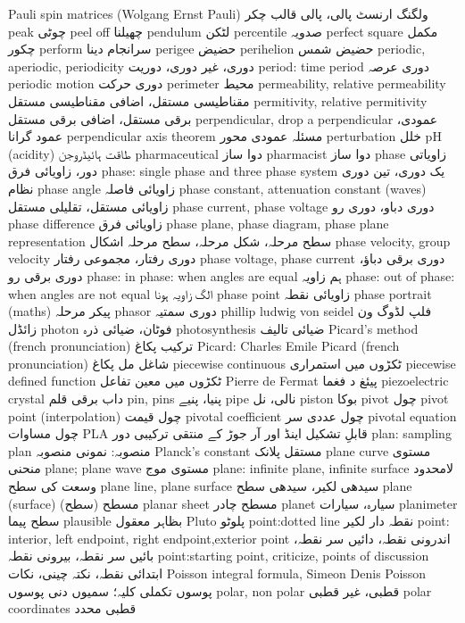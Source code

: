 Pauli spin matrices (Wolgang Ernst Pauli)	ولگنگ ارنسٹ پالی، پالی قالب چکر
peak	چوٹی
peel off	چھیلنا
pendulum	لٹکن
percentile	صدویہ
perfect square	مکمل چکور
perform	سرانجام دینا
perigee	حضیض
perihelion	حضیض شمس
periodic, aperiodic, periodicity	دوری، غیر دوری، دوریت
period: time period	دوری عرصہ
periodic motion	دوری حرکت
perimeter	محیط
permeability, relative permeability	مقناطیسی مستقل، اضافی مقناطیسی مستقل
permitivity, relative permitivity	برقی مستقل، اضافی برقی مستقل
perpendicular, drop a perpendicular	عمودی، عمود گرانا
perpendicular axis theorem	مسئلہ عمودی محور
perturbation	خلل
pH (acidity)	طاقت ہائیڈروجن
pharmaceutical	دوا ساز
pharmacist	دوا ساز
phase	زاویاتی دور، زاویائی فرق
phase: single phase and three phase system	یک دوری، تین دوری نظام
phase angle	زاویائی فاصلہ
phase constant, attenuation constant (waves)	زاویائی مستقل، تقلیلی مستقل
phase current, phase voltage	دوری دباو، دوری رو
phase difference	زاویائی فرق
phase plane, phase diagram, phase plane representation	سطح مرحلہ، شکل مرحلہ، سطح مرحلہ اشکال
phase velocity, group velocity	دوری رفتار، مجموعی رفتار
phase voltage, phase current	دوری برقی دباؤ، دوری برقی رو
phase: in phase: when angles are equal	ہم زاویہ
phase: out of phase: when angles are not equal	الگ زاویہ ہونا
phase point	زاویائی نقطہ
phase portrait (maths)	پیکر مرحلہ
phasor	دوری سمتیہ
phillip ludwig von seidel	فلپ لڈوگ ون زائڈل
photon	فوٹان، ضیائی ذرہ
photosynthesis	ضیائی تالیف
Picard’s method  (french pronunciation)	ترکیب پکاغ
Picard: Charles Emile Picard (french pronunciation)	شاغل مل پکاغ
piecewise continuous	ٹکڑوں میں استمراری
piecewise defined function	ٹکڑوں میں معین تفاعل
Pierre de Fermat	پیئغ د فغما
piezoelectric crystal	داب برقی قلم
pin, pins	پنیا، پنیے
pipe	نالی، نل
piston	بوکا
pivot	چول
pivot point (interpolation)	چول قیمت
pivotal coefficient	چول عددی سر
pivotal equation	چول مساوات
PLA	قابلِ تشکیل اینڈ اور آر جوڑ کے منتقی ترکیبی دور
plan: sampling plan	منصوبہ: نمونی منصوبہ
Planck's constant	مستقل پلانک
plane curve	مستوی منحنی
plane; plane wave	مستوی موج
plane: infinite plane, infinite surface	لامحدود وسعت کی سطح
plane line, plane surface	سیدھی لکیر، سیدھی سطح
plane (surface)	مسطح (سطح)
planar sheet	مسطح چادر
planet	سیارہ، سیارات
planimeter	سطح پیما
plausible	بظاہر معقول
Pluto	پلوٹو
point:dotted line	نقطہ دار لکیر
point: interior, left endpoint, right endpoint,exterior point	اندرونی نقطہ، دائیں سر نقطہ، بائیں سر نقطہ، بیرونی نقطہ
point:starting point, criticize, points of discussion	ابتدائی نقطہ، نکتہ چینی، نکات
Poisson integral formula, Simeon Denis Poisson	پوسوں تکملی کلیہ؛ سمیوں دنی پوسوں
polar, non polar	قطبی، غیر قطبی
polar coordinates	قطبی محدد
